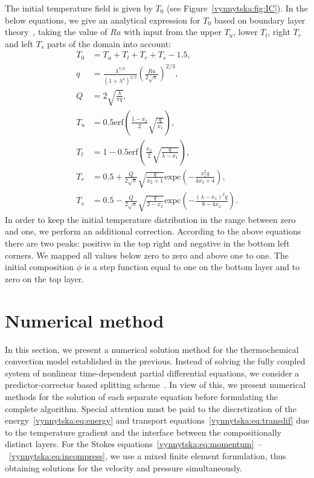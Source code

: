 The initial temperature field is given by $T_0$ (see
Figure~\ref{vynnytska:fig:IC}).  In the below equations, we
give an analytical expression for $T_0$ based on boundary layer
theory~\citep{KekenEtAl1997}, taking the value of $Ra$ with input from
the upper $T_u$, lower $T_l$, right $T_r$ and left $T_s$ parts of the
domain into account:
\begin{align}
    T_0 &= T_u + T_l + T_r + T_s - 1.5,
\\
  q &= \frac{\lambda^{7/3}}{\left(1 + \lambda^4 \right)^{2/3}} \left( \frac{Ra}{2 \sqrt{\pi}}\right)^{2/3},
\\
  Q & = 2\sqrt{\frac{\lambda}{\pi q}},
\\
    T_u &= 0.5 \mathrm{erf} \left( \frac{1-x_2}{2} \sqrt{\frac{q}{x_1}  } \right),
\\
    T_l &= 1 - 0.5 \mathrm{erf} \left( \frac{x_2}{2} \sqrt{\frac{q}{\lambda - x_1}  } \right),
\\
    T_r &= 0.5 + \frac{Q}{2\sqrt{\pi}} \sqrt{\frac{q}{x_{2} + 1} } \mathrm{expc} \left( - \frac{x_1^2 q}{4 x_2 + 4} \right),
\\
    T_s &= 0.5 - \frac{Q}{2\sqrt{\pi}} \sqrt{\frac{q}{2 - x_{2}} } \mathrm{expc} \left( - \frac{ \left(\lambda - x_1 \right)^2  q}{8 - 4 x_2} \right).
\end{align}
In order to keep the initial temperature distribution in the range
between zero and one, we perform an additional correction. According
to the above equations there are two peaks: positive in the top
right and negative in the bottom left corners. We mapped all values
below zero to zero and above one to one. The initial composition
$\phi$ is a step function equal to one on the bottom layer and to zero
on the top layer.


\section{Numerical method}

In this section, we present a numerical solution method for the
thermochemical convection model established in the previous. Instead
of solving the fully coupled system of nonlinear time-dependent partial
differential equations, we consider a predictor-corrector based splitting
scheme~\citep{BergKekenYuen1993, HansenEbel1988}. In view of this, we
present numerical methods for the solution of each separate equation
before formulating the complete algorithm. Special attention must be
paid to the discretization of the energy~\eqref{vynnytska:eq:energy}
and transport equations~\eqref{vynnytska:eq:transdif}
due to the temperature gradient and the interface
between the compositionally distinct layers. For the Stokes
equations~\eqref{vynnytska:eq:momentum}~--~\eqref{vynnytska:eq:incompress},
we use a mixed finite element formulation, thus obtaining solutions for
the velocity and pressure simultaneously.


